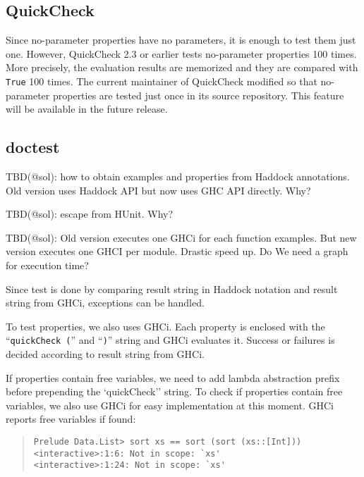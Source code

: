 \documentclass[preprint]{sigplanconf}
\begin{document}
\subsection{QuickCheck}

Since no-parameter properties have no parameters,
it is enough to test them just one.
However, QuickCheck 2.3 or earlier tests no-parameter properties 100 times.
More precisely, the evaluation results are memorized and they are
compared with {\tt True} 100 times.
The current maintainer of QuickCheck modified so that
no-parameter properties are tested just once in its source repository.
This feature will be available in the future release.

\subsection{doctest}
\label{sec:doctest}

TBD(@sol): how to obtain examples and properties from Haddock annotations.
Old version uses Haddock API but now uses GHC API directly. Why?

TBD(@sol): escape from HUnit. Why?

TBD(@sol): Old version executes one GHCi for each function examples.
But new version executes one GHCI per module.
Drastic speed up. Do We need a graph for execution time?

Since test is done by comparing result string in Haddock notation
and result string from GHCi, exceptions can be handled.

To test properties, we also uses GHCi.
Each property is enclosed with
the ``\verb|quickCheck (|'' and ``\verb|)|'' string
and GHCi evaluates it.
Success or failures is decided according to result string from GHCi.

If properties contain free variables,
we need to add lambda abstraction prefix before prepending
the `quickCheck'' string.
To check if properties contain free variables,
we also use GHCi for easy implementation at this moment.
GHCi reports free variables if found:

\begin{quote}
\small
\begin{verbatim}
Prelude Data.List> sort xs == sort (sort (xs::[Int]))
<interactive>:1:6: Not in scope: `xs'
<interactive>:1:24: Not in scope: `xs'
\end{verbatim}
\end{quote}
\end{document}
